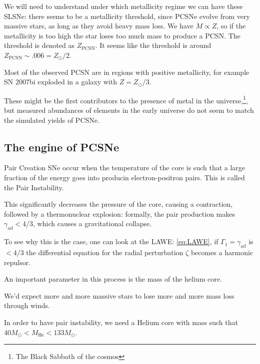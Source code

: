 \documentclass[main.tex]{subfiles}
\begin{document}
We will need to understand under which metallicity regime we can have these SLSNe: there seems to be a metallicity threshold, since PCSNe evolve from very massive stars, as long as they avoid heavy mass loss. 
We have \(\dot{M} \propto Z\), so if the metallicity is too high the star loses too much mass to produce a PCSN. The threshold is denoted as \(Z _{\text{PCSN}}\).
It seems like the threshold is around \(Z _{\text{PCSN}}\sim \num{.006} = Z_{\odot} / 2\).

Most of the observed PCSN are in regions with positive metallicity, for example SN 2007bi exploded in a galaxy with \(Z = Z_{\odot} /3\).

These might be the first contributors to the presence of metal in the universe,\footnote{The Black Sabbath of the cosmos}, but measured abundances of elements in the early universe do not seem to match the simulated yields of PCSNe.

\subsection{The engine of PCSNe}


Pair Creation SNe occur when the temperature of the core is such that a large fraction of the energy goes into producin electron-positron pairs. This is called the Pair Instability.

This significantly decreases the pressure of the core, causing a contraction, followed by a thermonuclear explosion: formally, the pair production makes \(\gamma _{\text{ad}} < 4/3\), which causes a gravitational collapse.

To see why this is the case, one can look at the LAWE: \eqref{eq:LAWE}, if \(\Gamma_1 = \gamma_{\text{ad}}\) is \(< 4/3\) the differential equation for the radial perturbation \(\zeta \) becomes a harmonic repulsor.


An important parameter in this process is the mass of the helium core. 

We'd expect more and more massive stars to lose more and more mass loss through winds. 

In order to have pair instability, we need a Helium core with mass such that \(40 M_{\odot} < M _{\text{He}} < 133 M_{\odot}\).
\end{document}
